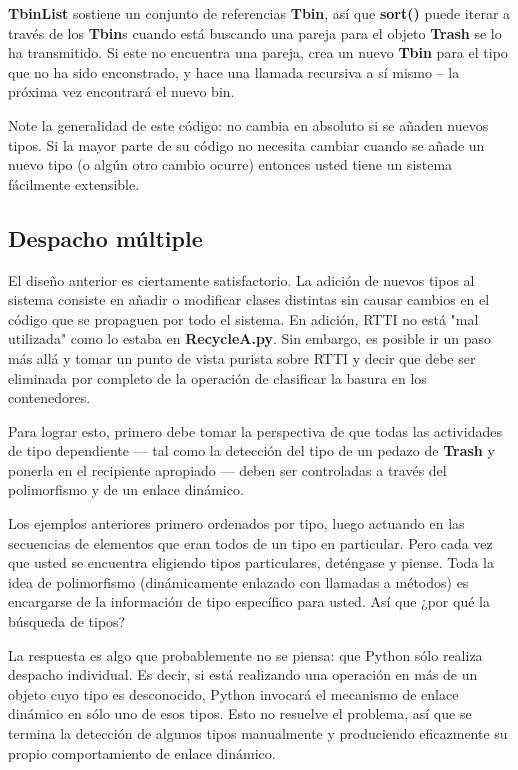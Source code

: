 \textbf{TbinList} sostiene un conjunto de referencias \textbf{Tbin}, así que \textbf{sort()} puede iterar a través de los \textbf{Tbin}s cuando está buscando una pareja para el objeto \textbf{Trash} se lo ha transmitido. Si este no encuentra una pareja, crea un nuevo \textbf{Tbin} para el tipo que no ha sido enconstrado, y hace una llamada recursiva a sí mismo – la próxima vez encontrará el nuevo bin.

Note la generalidad de este código: no cambia en absoluto si se añaden nuevos tipos. Si la mayor parte de su código no necesita cambiar cuando se añade un nuevo tipo (o algún otro cambio ocurre) entonces usted tiene un sistema fácilmente extensible.

\newpage


\subsection*{Despacho múltiple}
\label{subsec:dmul}

El diseño anterior es ciertamente satisfactorio. La adición de nuevos tipos al sistema consiste en añadir o modificar clases distintas sin causar cambios en el código que se propaguen por todo el sistema. En adición, RTTI no está "mal utilizada" como lo estaba en \textbf{RecycleA.py}. Sin embargo, es posible ir un paso más allá y tomar un punto de vista purista sobre RTTI y decir que debe ser eliminada por completo de la operación de clasificar la basura en los contenedores. \newline

Para lograr esto, primero debe tomar la perspectiva de que todas las actividades de tipo dependiente — tal como la detección del tipo de un pedazo de \textbf{Trash} y ponerla en el recipiente apropiado — deben ser controladas a través del polimorfismo y de un enlace dinámico. \newline

Los ejemplos anteriores primero ordenados por tipo, luego actuando en las secuencias de elementos que eran todos de un tipo en particular. Pero cada vez que usted se encuentra eligiendo tipos particulares, deténgase y piense. 
Toda la idea de polimorfismo (dinámicamente enlazado con llamadas a métodos) es encargarse de la información de tipo específico para usted. Así que ¿por qué la búsqueda de tipos?      \newline

La respuesta es algo que probablemente no se piensa: que Python sólo realiza despacho individual. Es decir, si está realizando una operación en más de un objeto cuyo tipo es desconocido, Python invocará el mecanismo de enlace dinámico en sólo uno de esos tipos. Esto no resuelve el problema, así que se termina la detección de algunos tipos manualmente y produciendo eficazmente su propio comportamiento de enlace dinámico. \newline

